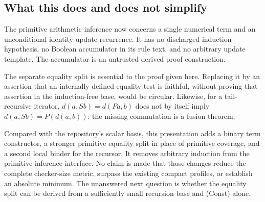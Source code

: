 \subsection{What this does and does not simplify}

The primitive arithmetic inference now concerns a single numerical term
and an unconditional identity-update recurrence.  It has no discharged
induction hypothesis, no Boolean accumulator in its rule text, and no
arbitrary update template.  The accumulator is an untrusted derived
proof construction.

The separate equality split is essential to the proof given here.
Replacing it by an assertion that an internally defined equality test
is faithful, without proving that assertion in the induction-free base,
would be circular.  Likewise, for a tail-recursive iterator,
$d(a,Sb)=d(Pa,b)$ does not by itself imply
$d(a,Sb)=P(d(a,b))$: the missing commutation is a fusion theorem.

Compared with the repository's scalar basis, this presentation adds a
binary term constructor, a stronger primitive equality split in place
of primitive coverage, and a second local binder for the recursor.
It removes arbitrary induction from the primitive inference interface.
No claim is made that those changes reduce the complete checker-size
metric, surpass the existing compact profiles, or establish an absolute
minimum.  The unanswered next question is whether the equality split
can be derived from a sufficiently small recursion base and
\textup{(Const)} alone.
